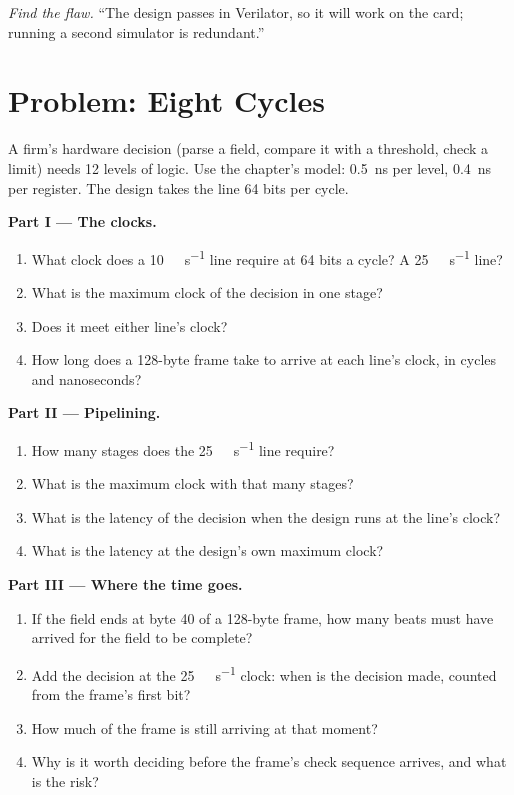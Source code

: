\begin{exercise}[$\star\star\star$]\label{exo:nw:programmable-hardware-i-architecture-and-toolchain:8}
\emph{Find the flaw.} ``The design passes in Verilator, so it will work on the card; running a second simulator is redundant.''
\end{exercise}

\section{Problem: Eight Cycles}

\begin{problem}\label{pb:nw:programmable-hardware-i-architecture-and-toolchain:1}
A firm's hardware decision (parse a field, compare it with a threshold, check a limit) needs 12 levels of logic. Use the chapter's model:
\qty{0.5}{\nano\second} per level, \qty{0.4}{\nano\second} per register. The design takes the line 64 bits per cycle.

\medskip\noindent\textbf{Part I --- The clocks.}
\begin{enumerate}
\item What clock does a \qty{10}{\giga\bit\per\second} line require at 64 bits a cycle? A \qty{25}{\giga\bit\per\second} line?
\item What is the maximum clock of the decision in one stage?
\item Does it meet either line's clock?
\item How long does a 128-byte frame take to arrive at each line's clock, in cycles and nanoseconds?
\end{enumerate}

\medskip\noindent\textbf{Part II --- Pipelining.}
\begin{enumerate}[resume]
\item How many stages does the \qty{25}{\giga\bit\per\second} line require?
\item What is the maximum clock with that many stages?
\item What is the latency of the decision when the design runs at the line's clock?
\item What is the latency at the design's own maximum clock?
\end{enumerate}

\medskip\noindent\textbf{Part III --- Where the time goes.}
\begin{enumerate}[resume]
\item If the field ends at byte 40 of a 128-byte frame, how many beats must have arrived for the field to be complete?
\item Add the decision at the \qty{25}{\giga\bit\per\second} clock: when is the decision made, counted from the frame's first bit?
\item How much of the frame is still arriving at that moment?
\item Why is it worth deciding before the frame's check sequence arrives, and what is the risk?
\end{enumerate}


\end{problem}
